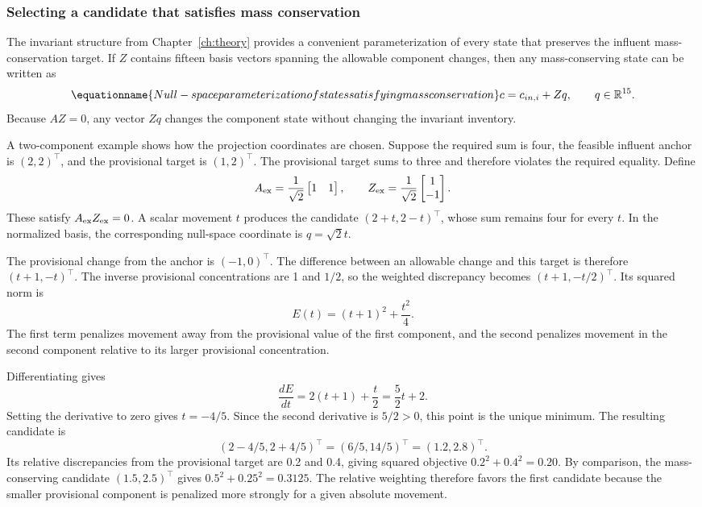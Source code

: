 \subsubsection{Selecting a candidate that satisfies mass conservation}

The invariant structure from Chapter~\ref{ch:theory} provides a convenient parameterization of every state that preserves the influent mass-conservation target. If $Z$ contains fifteen basis vectors spanning the allowable component changes, then any mass-conserving state can be written as
\begin{equation}
\equationname{Null-space parameterization of states satisfying mass conservation}
c=c_{in,i}+Zq,\qquad q\in\mathbb{R}^{15}.
\label{eq:projection_affine_parameterization}
\end{equation}
Because $AZ=0$, any vector $Zq$ changes the component state without changing the invariant inventory.

A two-component example shows how the projection coordinates are chosen. Suppose the required sum is four, the feasible influent anchor is $(2,2)^\top$, and the provisional target is $(1,2)^\top$. The provisional target sums to three and therefore violates the required equality. Define
\[
A_{\rm ex}=\frac1{\sqrt2}\begin{bmatrix}1&1\end{bmatrix},\qquad
Z_{\rm ex}=\frac1{\sqrt2}\begin{bmatrix}1\\-1\end{bmatrix}.
\]
These satisfy $A_{\rm ex}Z_{\rm ex}=0$. A scalar movement $t$ produces the candidate
$(2+t,2-t)^\top$, whose sum remains four for every $t$. In the normalized basis, the corresponding null-space coordinate is $q=\sqrt2t$.

The provisional change from the anchor is $(-1,0)^\top$. The difference between an allowable change and this target is therefore $(t+1,-t)^\top$. The inverse provisional concentrations are 1 and $1/2$, so the weighted discrepancy becomes $(t+1,-t/2)^\top$. Its squared norm is
\[
E(t)=(t+1)^2+\frac{t^2}{4}.
\]
The first term penalizes movement away from the provisional value of the first component, and the second penalizes movement in the second component relative to its larger provisional concentration.

Differentiating gives
\[
\frac{dE}{dt}=2(t+1)+\frac t2=\frac52t+2.
\]
Setting the derivative to zero gives $t=-4/5$. Since the second derivative is $5/2>0$, this point is the unique minimum. The resulting candidate is
\[
(2-4/5,2+4/5)^\top=(6/5,14/5)^\top=(1.2,2.8)^\top.
\]
Its relative discrepancies from the provisional target are 0.2 and 0.4, giving squared objective
$0.2^2+0.4^2=0.20$.
By comparison, the mass-conserving candidate $(1.5,2.5)^\top$ gives
$0.5^2+0.25^2=0.3125$.
The relative weighting therefore favors the first candidate because the smaller provisional component is penalized more strongly for a given absolute movement.

